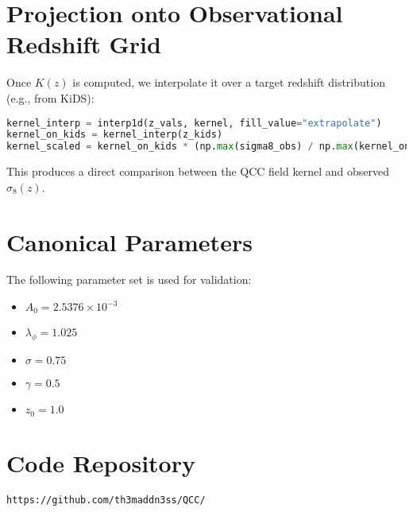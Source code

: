 \documentclass[12pt]{article}
\begin{document}
\section{Projection onto Observational Redshift Grid}
Once $K(z)$ is computed, we interpolate it over a target redshift distribution (e.g., from KiDS):
\begin{lstlisting}[language=Python]
kernel_interp = interp1d(z_vals, kernel, fill_value="extrapolate")
kernel_on_kids = kernel_interp(z_kids)
kernel_scaled = kernel_on_kids * (np.max(sigma8_obs) / np.max(kernel_on_kids))
\end{lstlisting}
This produces a direct comparison between the QCC field kernel and observed $\sigma_8(z)$.

\section{Canonical Parameters}
The following parameter set is used for validation:
\begin{itemize}
  \item $A_0 = 2.5376 \times 10^{-3}$
  \item $\lambda_\phi = 1.025$
  \item $\sigma = 0.75$
  \item $\gamma = 0.5$
  \item $z_0 = 1.0$
\end{itemize}

\section*{Code Repository}
\texttt{https://github.com/th3maddn3ss/QCC/}
\end{document}
